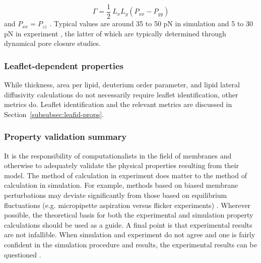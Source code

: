 \documentclass[9pt,bestpractices]{livecoms}
\begin{document}
\begin{equation}\label{eq:11}
	\Gamma = \frac{1}{2}\ L_x L_y (P_{xx} - P_{yy})
\end{equation}
and $P_{xx} = P_{zz}$ \cite{Tolpekina2004b}.
Typical values are around 35 to 50 pN in simulation \cite{Tolpekina2004b,Wohlert2006} and 5 to 30 pN in experiment \cite{Brochard-Wyarta2000,Moroz1996,Zhelev1993}, the latter of which are typically determined through dynamical pore closure studies.

\subsubsection{Leaflet-dependent properties}
\label{subsubsec:leafprops}
While thickness, area per lipid, deuterium order parameter, and lipid lateral diffusivity calculations do not necessarily require leaflet identification, other metrics do. Leaflet identification and the relevant metrics are discussed in Section~\ref{subsubsec:leafid-props}.

\subsubsection{Property validation summary}
\label{subsubsec:validationsumm}
It is the responsibility of computationalists in the field of membranes and otherwise to adequately validate the physical properties resulting from their model.
The method of calculation in experiment does matter to the method of calculation in simulation.
For example, methods based on biased membrane perturbations may deviate significantly from those based on equilibrium fluctuations (e.g. micropipette aspiration versus flicker experiments) \cite{Venable2015}.
Wherever possible, the theoretical basis for both the experimental and simulation property calculations should be used as a guide.
A final point is that experimental results are not infallible.
When simulation and experiment do not agree and one is fairly confident in the simulation procedure and results, the experimental results can be questioned \cite{Venable2015}.
\end{document}
